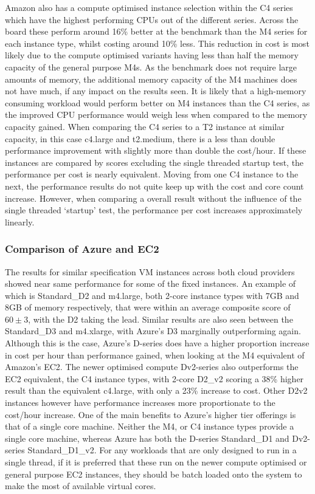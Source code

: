 \documentclass[conference]{IEEEtran}
\begin{document}
Amazon also has a compute optimised instance selection within the C4 series which have the highest performing CPUs out of the different series. Across the board these perform around 16\% better at the benchmark than the M4 series for each instance type, whilst costing around 10\% less. This reduction in cost is most likely due to the compute optimised variants having less than half the memory capacity of the general purpose M4s. As the benchmark does not require large amounts of memory, the additional memory capacity of the M4 machines does not have much, if any impact on the results seen. It is likely that a high-memory consuming workload would perform better on M4 instances than the C4 series, as the improved CPU performance would weigh less when compared to the memory capacity gained. When comparing the C4 series to a T2 instance at similar capacity, in this case c4.large and t2.medium, there is a less than double performance improvement with slightly more than double the cost/hour. If these instances are compared by scores excluding the single threaded startup test, the performance per cost is nearly equivalent. Moving from one C4 instance to the next, the performance results do not quite keep up with the cost and core count increase. However, when comparing a overall result without the influence of the single threaded `startup' test, the performance per cost increases approximately linearly.


\subsubsection{Comparison of Azure and EC2}

The results for similar specification VM instances across both cloud providers showed near same performance for some of the fixed instances. An example of which is Standard\_D2 and m4.large, both 2-core instance types with 7GB and 8GB of memory respectively, that were within an average composite score of $60\pm3$, with the D2 taking the lead. Similar results are also seen between the Standard\_D3 and m4.xlarge, with Azure's D3 marginally outperforming again. Although this is the case, Azure's D-series does have a higher proportion increase in cost per hour than performance gained, when looking at the M4 equivalent of Amazon's EC2. The newer optimised compute Dv2-series also outperforms the EC2 equivalent, the C4 instance types, with 2-core D2\_v2 scoring a 38\% higher result than the equivalent c4.large, with only a 23\% increase to cost. Other D2v2 instances however have performance increases more proportionate to the cost/hour increase. One of the main benefits to Azure's higher tier offerings is that of a single core machine. Neither the M4, or C4 instance types provide a single core machine, whereas Azure has both the D-series Standard\_D1 and Dv2-series Standard\_D1\_v2. For any workloads that are only designed to run in a single thread, if it is preferred that these run on the newer compute optimised or general purpose EC2 instances, they should be batch loaded onto the system to make the most of available virtual cores.
\end{document}
